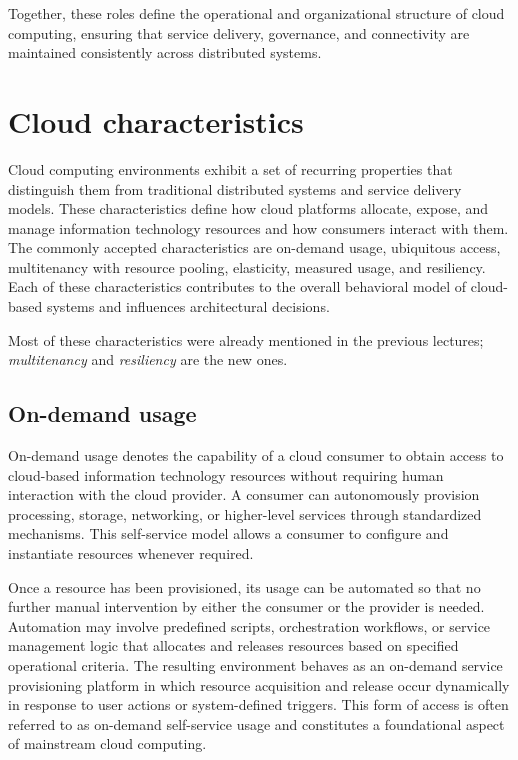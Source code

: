 Together, these roles define the operational and organizational structure of cloud computing, ensuring that service delivery, governance, and connectivity are maintained consistently across distributed systems.

\section{Cloud characteristics}

Cloud computing environments exhibit a set of recurring properties that distinguish them from traditional distributed systems and service delivery models. These characteristics define how cloud platforms allocate, expose, and manage information technology resources and how consumers interact with them. The commonly accepted characteristics are on-demand usage, ubiquitous access, multitenancy with resource pooling, elasticity, measured usage, and resiliency. Each of these characteristics contributes to the overall behavioral model of cloud-based systems and influences architectural decisions.

Most of these characteristics were already mentioned in the previous lectures; \emph{multitenancy} and \emph{resiliency} are the new ones.

\subsection{On-demand usage}

On-demand usage denotes the capability of a cloud consumer to obtain access to cloud-based information technology resources without requiring human interaction with the cloud provider. A consumer can autonomously provision processing, storage, networking, or higher-level services through standardized mechanisms. This self-service model allows a consumer to configure and instantiate resources whenever required.

Once a resource has been provisioned, its usage can be automated so that no further manual intervention by either the consumer or the provider is needed. Automation may involve predefined scripts, orchestration workflows, or service management logic that allocates and releases resources based on specified operational criteria. The resulting environment behaves as an on-demand service provisioning platform in which resource acquisition and release occur dynamically in response to user actions or system-defined triggers. This form of access is often referred to as on-demand self-service usage and constitutes a foundational aspect of mainstream cloud computing.

